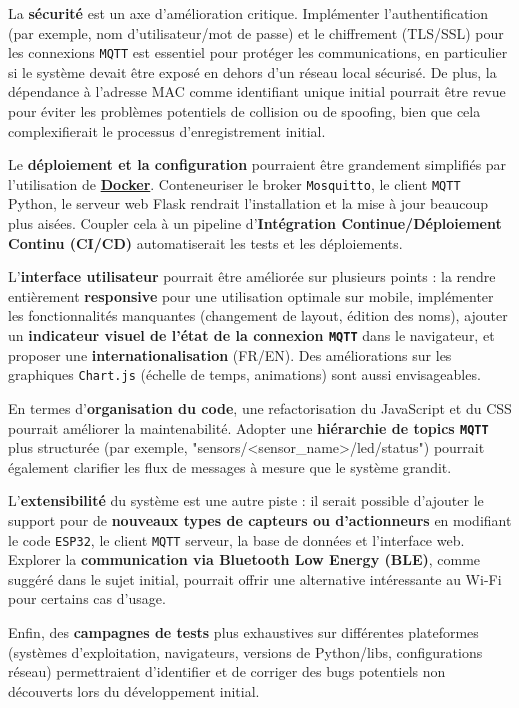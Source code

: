 \documentclass[12pt]{article}
\begin{document}
La \textbf{sécurité} est un axe d'amélioration critique. Implémenter l'authentification (par exemple, nom d'utilisateur/mot de passe) et le chiffrement (TLS/SSL) pour les connexions \texttt{MQTT} est essentiel pour protéger les communications, en particulier si le système devait être exposé en dehors d'un réseau local sécurisé. De plus, la dépendance à l'adresse MAC comme identifiant unique initial pourrait être revue pour éviter les problèmes potentiels de collision ou de spoofing, bien que cela complexifierait le processus d'enregistrement initial.

Le \textbf{déploiement et la configuration} pourraient être grandement simplifiés par l'utilisation de \textbf{\href{https://www.docker.com/}{Docker}}. Conteneuriser le broker \texttt{Mosquitto}, le client \texttt{MQTT} Python, le serveur web Flask rendrait l'installation et la mise à jour beaucoup plus aisées. Coupler cela à un pipeline d'\textbf{Intégration Continue/Déploiement Continu (CI/CD)} automatiserait les tests et les déploiements.

L'\textbf{interface utilisateur} pourrait être améliorée sur plusieurs points : la rendre entièrement \textbf{responsive} pour une utilisation optimale sur mobile, implémenter les fonctionnalités manquantes (changement de layout, édition des noms), ajouter un \textbf{indicateur visuel de l'état de la connexion \texttt{MQTT}} dans le navigateur, et proposer une \textbf{internationalisation} (FR/EN). Des améliorations sur les graphiques \texttt{Chart.js} (échelle de temps, animations) sont aussi envisageables.

En termes d'\textbf{organisation du code}, une refactorisation du JavaScript et du CSS pourrait améliorer la maintenabilité. Adopter une \textbf{hiérarchie de topics \texttt{MQTT}} plus structurée (par exemple, "sensors/<sensor\_name>/led/status") pourrait également clarifier les flux de messages à mesure que le système grandit.

L'\textbf{extensibilité} du système est une autre piste : il serait possible d'ajouter le support pour de \textbf{nouveaux types de capteurs ou d'actionneurs} en modifiant le code \texttt{ESP32}, le client \texttt{MQTT} serveur, la base de données et l'interface web. Explorer la \textbf{communication via Bluetooth Low Energy (BLE)}, comme suggéré dans le sujet initial, pourrait offrir une alternative intéressante au Wi-Fi pour certains cas d'usage.

Enfin, des \textbf{campagnes de tests} plus exhaustives sur différentes plateformes (systèmes d'exploitation, navigateurs, versions de Python/libs, configurations réseau) permettraient d'identifier et de corriger des bugs potentiels non découverts lors du développement initial.
\end{document}
